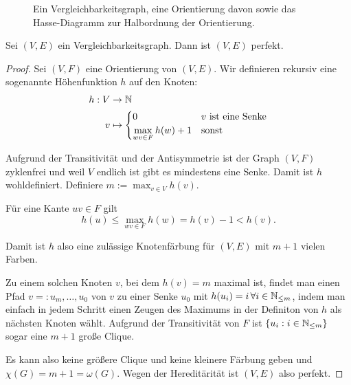 \documentclass[../main.tex]{subfiles}
\begin{document}
\begin{figure}[ht]
    \caption{Ein Vergleichbarkeitsgraph, eine Orientierung davon sowie das Hasse-Diagramm zur Halbordnung der Orientierung.}
\end{figure}

\begin{satz}
    Sei $(V, E)$ ein Vergleichbarkeitsgraph. Dann ist $(V, E)$ perfekt.
\end{satz}
\begin{proof}
    Sei $(V, F)$ eine Orientierung von $(V, E)$. Wir definieren rekursiv eine sogenannte Höhenfunktion $h$ auf den Knoten:
    \begin{align*}
        h : V &\to \mathbb{N} \\
        v &\mapsto \begin{cases}
            0 &v \text{ ist eine Senke}\\
            \max\limits_{wv \in F} h(w) + 1 &\text {sonst}
        \end{cases}
    \end{align*}
    
    Aufgrund der Transitivität und der Antisymmetrie ist der Graph $(V, F)$ zyklenfrei und weil $V$ endlich ist gibt es mindestens eine Senke. Damit ist $h$ wohldefiniert. Definiere $m := \max_{v \in V} h(v)$.

    Für eine Kante $uv \in F$ gilt
    $$h(u) \leq \max\limits_{wv \in F} h(w) = h(v) - 1 < h(v).$$

    Damit ist $h$ also eine zulässige Knotenfärbung für $(V, E)$ mit $m + 1$ vielen Farben.
    
    Zu einem solchen Knoten $v$, bei dem $h(v) = m$ maximal ist, findet man einen Pfad $v =: u_m, \hdots, u_0$ von $v$ zu einer Senke $u_0$ mit $h(u_i) = i\, \forall i \in \mathbb{N}_{\leq m}$, indem man einfach in jedem Schritt einen Zeugen des Maximums in der Definiton von $h$ als nächsten Knoten wählt. Aufgrund der Transitivität von $F$ ist $\{u_i : i \in \mathbb{N}_{\leq m}\}$ sogar eine $m+1$ große Clique.
    
    Es kann also keine größere Clique und keine kleinere Färbung geben und $\chi(G) = m+1 = \omega(G)$. Wegen der Hereditärität ist $(V, E)$ also perfekt.
\end{proof}
\end{document}
